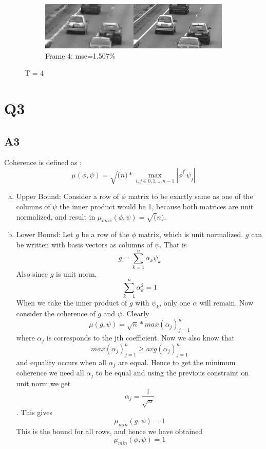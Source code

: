 \documentclass{article}
\begin{document}
\begin{figure}[H]
  \begin{subfigure}[t]{1.0\linewidth}
    \centering
    \includegraphics[scale=0.5]{images/frame_4_t4}
    \caption{Frame 4: mse=1.507\%}
  \end{subfigure}
  \caption{T = 4}
\end{figure}






\section*{Q3}
\subsection*{A3}
Coherence is defined as : $$\mu(\phi,\psi) = \sqrt(n)*\max_{i,j \in {0,1,..,n-1}} |\phi^{i^{t}}\psi_j|$$

\begin{enumerate}[(a)]
\item Upper Bound:
  Consider a row of $\phi$ matrix to be exactly same as one of the columns of $\psi$ the inner product would be 1, because both matrices are unit normalized, and result in $\mu_{max}(\phi,\psi) = \sqrt(n)$.
\item Lower Bound:
  Let $g$ be a row of the $\phi$ matrix, which is unit normalized. $g$ can be written with basis vectors as columns of $\psi$. That is
  $$g = \sum_{k=1}^{n}\alpha_k \psi_k$$
  Also since $g$ is unit norm, $$\sum_{k=1}^n\alpha_k^2 = 1$$
  When we take the inner product of $g$ with $\psi_k$, only one $\alpha$ will remain. Now consider the coherence of $g$ and $\psi$. Clearly
  $$\mu(g,\psi) = \sqrt{n} * max(\alpha_j)_{j=1}^n$$ where $\alpha_j$ is corresponds to the jth coefficient. Now we also know that $$max(\alpha_j)_{j=1}^n \ge avg(\alpha_j)_{j=1}^n$$ and equality occurs when all $\alpha_j$ are equal. Hence to get the minimum coherence we need all $\alpha_j$ to be equal and using the previous constraint on unit norm we get $$\alpha_j = \frac{1}{\sqrt{n}}$$. This gives $$\mu_{min}(g,\psi) = 1$$
  This is the bound for all rows, and hence we have obtained $$\mu_{min}(\phi,\psi) = 1$$
\end{enumerate}
\end{document}
